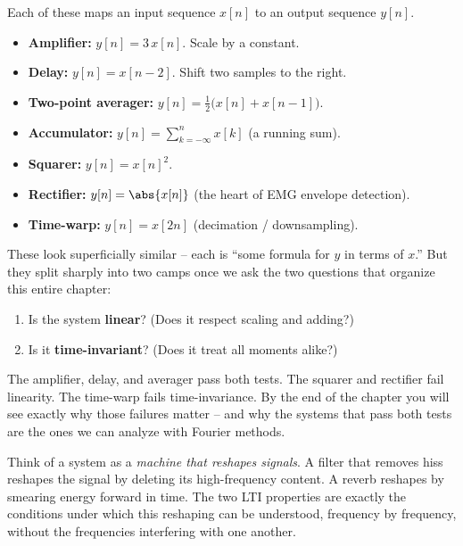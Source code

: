 \begin{example}
\label{ch12:zoo}
Each of these maps an input sequence $x[n]$ to an output sequence $y[n]$.
\begin{itemize}
  \item \textbf{Amplifier:} $y[n] = 3\,x[n]$. Scale by a constant.
  \item \textbf{Delay:} $y[n] = x[n-2]$. Shift two samples to the right.
  \item \textbf{Two-point averager:} $y[n] = \tfrac12\big(x[n] + x[n-1]\big)$.
  \item \textbf{Accumulator:} $y[n] = \sum_{k=-\infty}^{n} x[k]$ (a running sum).
  \item \textbf{Squarer:} $y[n] = x[n]^2$.
  \item \textbf{Rectifier:} $y[n] = \abs{x[n]}$ (the heart of EMG envelope
        detection).
  \item \textbf{Time-warp:} $y[n] = x[2n]$ (decimation / downsampling).
\end{itemize}
\end{example}

These look superficially similar -- each is ``some formula for $y$ in terms of
$x$.'' But they split sharply into two camps once we ask the two questions that
organize this entire chapter:

\begin{enumerate}
  \item Is the system \textbf{linear}? (Does it respect scaling and adding?)
  \item Is it \textbf{time-invariant}? (Does it treat all moments alike?)
\end{enumerate}

The amplifier, delay, and averager pass both tests. The squarer and rectifier
fail linearity. The time-warp fails time-invariance. By the end of the chapter
you will see exactly why those failures matter -- and why the systems that pass
both tests are the ones we can analyze with Fourier methods.

\begin{intuitionbox}
Think of a system as a \emph{machine that reshapes signals}. A filter that
removes hiss reshapes the signal by deleting its high-frequency content. A
reverb reshapes by smearing energy forward in time. The two LTI properties are
exactly the conditions under which this reshaping can be understood, frequency by
frequency, without the frequencies interfering with one another.
\end{intuitionbox}

